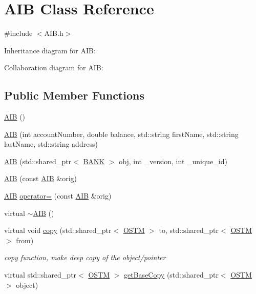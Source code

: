 \hypertarget{class_a_i_b}{}\section{A\+IB Class Reference}
\label{class_a_i_b}


{\ttfamily \#include $<$A\+I\+B.\+h$>$}



Inheritance diagram for A\+IB\+:


Collaboration diagram for A\+IB\+:
\subsection*{Public Member Functions}
\begin{DoxyCompactItemize}
\item 
\hyperlink{class_a_i_b_a4783110463bf12f937a85b62455faf38}{A\+IB} ()
\item 
\hyperlink{class_a_i_b_a5fe3963becf294f6b1ce1a747f9122a0}{A\+IB} (int account\+Number, double balance, std\+::string first\+Name, std\+::string last\+Name, std\+::string address)
\item 
\hyperlink{class_a_i_b_aa0faccb7aadf423d12bddb2469ff5053}{A\+IB} (std\+::shared\+\_\+ptr$<$ \hyperlink{class_b_a_n_k}{B\+A\+NK} $>$ obj, int \+\_\+version, int \+\_\+unique\+\_\+id)
\item 
\hyperlink{class_a_i_b_ab13d0db3498d59dbe6a946c469587c55}{A\+IB} (const \hyperlink{class_a_i_b}{A\+IB} \&orig)
\item 
\hyperlink{class_a_i_b}{A\+IB} \hyperlink{class_a_i_b_a77b6f74ea3ef39cb1ccb916db7a48740}{operator=} (const \hyperlink{class_a_i_b}{A\+IB} \&orig)
\item 
virtual \hyperlink{class_a_i_b_a22b11c50b0986326c86315957528bf79}{$\sim$\+A\+IB} ()
\item 
virtual void \hyperlink{class_a_i_b_ad76f25ce86cb42028440f41c371903e0}{copy} (std\+::shared\+\_\+ptr$<$ \hyperlink{class_o_s_t_m}{O\+S\+TM} $>$ to, std\+::shared\+\_\+ptr$<$ \hyperlink{class_o_s_t_m}{O\+S\+TM} $>$ from)
\begin{DoxyCompactList}\small\item\em copy function, make deep copy of the object/pointer \end{DoxyCompactList}\item 
virtual std\+::shared\+\_\+ptr$<$ \hyperlink{class_o_s_t_m}{O\+S\+TM} $>$ \hyperlink{class_a_i_b_a987107f3d7a04790f84c1e7eeee37575}{get\+Base\+Copy} (std\+::shared\+\_\+ptr$<$ \hyperlink{class_o_s_t_m}{O\+S\+TM} $>$ object)

\end{DoxyCompactItemize}
